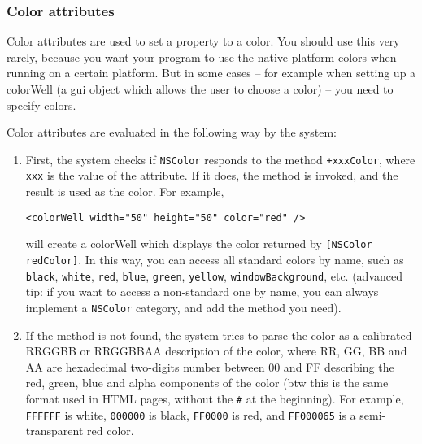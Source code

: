 \subsubsection{Color attributes}
Color attributes are used to set a property to a color.  You should
use this very rarely, because you want your program to use the native
platform colors when running on a certain platform.  But in some cases
-- for example when setting up a colorWell (a gui object which allows
the user to choose a color) -- you need to specify colors.

Color attributes are evaluated in the following way by the system: 
\begin{enumerate}
\item First, the system checks if \texttt{NSColor} responds to the
  method \texttt{+xxxColor}, where \texttt{xxx} is the value of the
  attribute.  If it does, the method is invoked, and the result is
  used as the color.  For example,
\begin{verbatim}
<colorWell width="50" height="50" color="red" />
\end{verbatim}
  will create a colorWell which displays the color returned by
  \texttt{[NSColor redColor]}.  In this way, you can access all
  standard colors by name, such as \texttt{black}, \texttt{white},
  \texttt{red}, \texttt{blue}, \texttt{green}, \texttt{yellow},
  \texttt{windowBackground}, etc.  (advanced tip: if you want to
  access a non-standard one by name, you can always implement a
  \texttt{NSColor} category, and add the method you need).
\item If the method is not found, the system tries to parse the color
  as a calibrated RRGGBB or RRGGBBAA description of the color, where
  RR, GG, BB and AA are hexadecimal two-digits number between 00 and
  FF describing the red, green, blue and alpha components of the color
  (btw this is the same format used in HTML pages, without the
  \texttt{\#} at the beginning).  For example, \texttt{FFFFFF} is
  white, \texttt{000000} is black, \texttt{FF0000} is red, and
  \texttt{FF000065} is a semi-transparent red color.
\end{enumerate}

